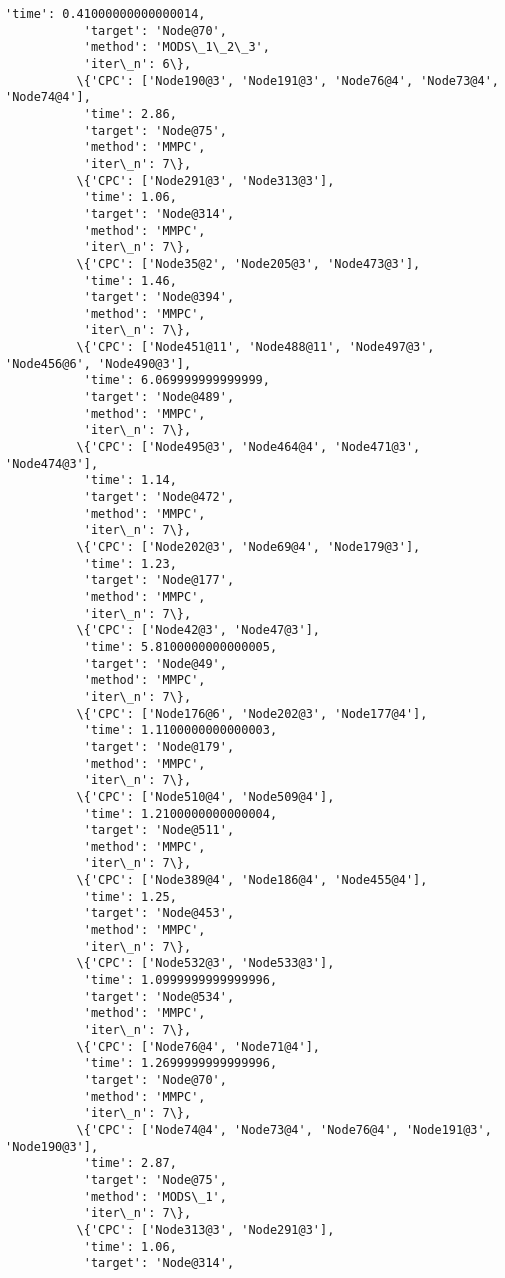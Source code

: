 \documentclass[11pt]{article}
\begin{document}
\begin{Verbatim}[commandchars=\\\{\}]
           'time': 0.41000000000000014,
           'target': 'Node@70',
           'method': 'MODS\_1\_2\_3',
           'iter\_n': 6\},
          \{'CPC': ['Node190@3', 'Node191@3', 'Node76@4', 'Node73@4', 'Node74@4'],
           'time': 2.86,
           'target': 'Node@75',
           'method': 'MMPC',
           'iter\_n': 7\},
          \{'CPC': ['Node291@3', 'Node313@3'],
           'time': 1.06,
           'target': 'Node@314',
           'method': 'MMPC',
           'iter\_n': 7\},
          \{'CPC': ['Node35@2', 'Node205@3', 'Node473@3'],
           'time': 1.46,
           'target': 'Node@394',
           'method': 'MMPC',
           'iter\_n': 7\},
          \{'CPC': ['Node451@11', 'Node488@11', 'Node497@3', 'Node456@6', 'Node490@3'],
           'time': 6.069999999999999,
           'target': 'Node@489',
           'method': 'MMPC',
           'iter\_n': 7\},
          \{'CPC': ['Node495@3', 'Node464@4', 'Node471@3', 'Node474@3'],
           'time': 1.14,
           'target': 'Node@472',
           'method': 'MMPC',
           'iter\_n': 7\},
          \{'CPC': ['Node202@3', 'Node69@4', 'Node179@3'],
           'time': 1.23,
           'target': 'Node@177',
           'method': 'MMPC',
           'iter\_n': 7\},
          \{'CPC': ['Node42@3', 'Node47@3'],
           'time': 5.8100000000000005,
           'target': 'Node@49',
           'method': 'MMPC',
           'iter\_n': 7\},
          \{'CPC': ['Node176@6', 'Node202@3', 'Node177@4'],
           'time': 1.1100000000000003,
           'target': 'Node@179',
           'method': 'MMPC',
           'iter\_n': 7\},
          \{'CPC': ['Node510@4', 'Node509@4'],
           'time': 1.2100000000000004,
           'target': 'Node@511',
           'method': 'MMPC',
           'iter\_n': 7\},
          \{'CPC': ['Node389@4', 'Node186@4', 'Node455@4'],
           'time': 1.25,
           'target': 'Node@453',
           'method': 'MMPC',
           'iter\_n': 7\},
          \{'CPC': ['Node532@3', 'Node533@3'],
           'time': 1.0999999999999996,
           'target': 'Node@534',
           'method': 'MMPC',
           'iter\_n': 7\},
          \{'CPC': ['Node76@4', 'Node71@4'],
           'time': 1.2699999999999996,
           'target': 'Node@70',
           'method': 'MMPC',
           'iter\_n': 7\},
          \{'CPC': ['Node74@4', 'Node73@4', 'Node76@4', 'Node191@3', 'Node190@3'],
           'time': 2.87,
           'target': 'Node@75',
           'method': 'MODS\_1',
           'iter\_n': 7\},
          \{'CPC': ['Node313@3', 'Node291@3'],
           'time': 1.06,
           'target': 'Node@314',

\end{Verbatim}
\end{document}

